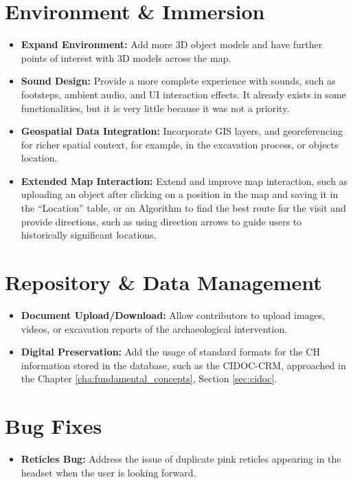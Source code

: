 \section*{Environment \& Immersion}
\begin{itemize}
    \item \textbf{Expand Environment:} Add more \gls{3D} object models and have further points of interest with \gls{3D} models across the map.
    \item \textbf{Sound Design:} Provide a more complete experience with sounds, such as footsteps, ambient audio, and \gls{UI} interaction effects. It already exists in some functionalities, but it is very little because it was not a priority.
    \item \textbf{Geospatial Data Integration:} Incorporate \gls{GIS} layers, and georeferencing for richer spatial context, for example, in the excavation process, or objects location.
    \item \textbf{Extended Map Interaction:} Extend and improve map interaction, such as uploading an object after clicking on a position in the map and saving it in the ``Location'' table, or an Algorithm to find the best route for the visit and provide directions, such as using direction arrows to guide users to historically significant locations.
\end{itemize}

\section*{Repository \& Data Management}
\begin{itemize}
    \item \textbf{Document Upload/Download:} Allow contributors to upload images, videos, or excavation reports of the archaeological intervention.
    \item \textbf{Digital Preservation:} Add the usage of standard formats for the \gls{CH} information stored in the database, such as the \gls{CIDOC-CRM}, approached in the Chapter \ref{cha:fundamental_concepts}, Section \ref{sec:cidoc}.
\end{itemize}
\section*{Bug Fixes}
\begin{itemize}
    \item \textbf{Reticles Bug:} Address the issue of duplicate pink reticles appearing in the headset when the user is looking forward.
\end{itemize}


